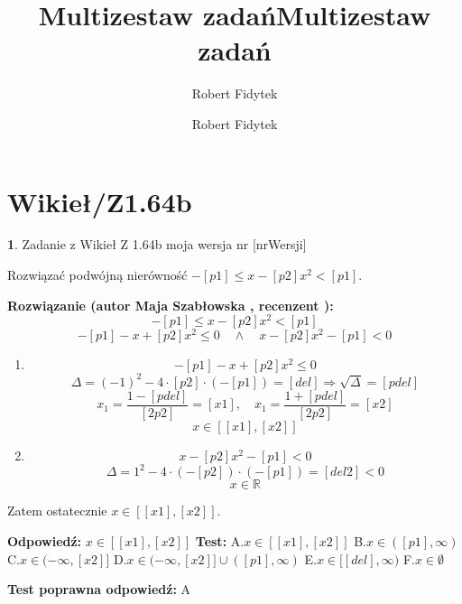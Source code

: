 \documentclass[12pt, a4paper]{article}
\title{Multizestaw zadań}
\author{Robert Fidytek}
\date{}\documentclass[12pt, a4paper]{article}
\title{Multizestaw zadań}
\author{Robert Fidytek}
\date{}
\theoremstyle{definition} %
\newtheorem{zad}{}
\theoremstyle{definition} %
\newtheorem{zad}{}
\newcommand{\kategoria}[1]{\section{#1}} %
\newcommand{\zadStart}[1]{\begin{zad}#1\newline} %
\newcommand{\zadStop}{\end{zad}}   %
\newcommand{\rozwStart}[2]{\noindent \textbf{Rozwiązanie (autor #1 , recenzent #2): }\newline} %
\newcommand{\rozwStop}{\newline}                                            %
\newcommand{\odpStart}{\noindent \textbf{Odpowiedź:}\newline}    %
\newcommand{\odpStop}{\newline}                                             %
\newcommand{\testStart}{\noindent \textbf{Test:}\newline} %
\newcommand{\testStop}{\newline} %
\newcommand{\kluczStart}{\noindent \textbf{Test poprawna odpowiedź:}\newline} %
\newcommand{\kluczStop}{\newline} %
\begin{document}
\maketitle


\kategoria{Wikieł/Z1.64b}
\zadStart{Zadanie z Wikieł Z 1.64b moja wersja nr [nrWersji]}

Rozwiązać podwójną nierówność $-[p1]\leq x-[p2]x^{2} < [p1].$
\zadStop

\rozwStart{Maja Szabłowska}{}
$$-[p1]\leq x-[p2]x^{2} < [p1]$$
$$-[p1]-x+[p2]x^{2} \leq 0 \quad \land \quad x-[p2]x^{2}-[p1]<0$$
\begin{enumerate}
    \item $$-[p1]-x+[p2]x^{2} \leq 0$$
    $$\Delta=(-1)^{2}-4\cdot[p2]\cdot(-[p1])=[del] \Rightarrow \sqrt{\Delta}=[pdel]$$
    $$x_{1}=\frac{1-[pdel]}{[2p2]}=[x1], \quad x_{1}=\frac{1+[pdel]}{[2p2]}=[x2]$$
    $$x\in[[x1],[x2]]$$
    
    \item $$x-[p2]x^{2}-[p1]<0$$
    $$\Delta=1^{2}-4\cdot(-[p2])\cdot(-[p1])=[del2] < 0$$
    $$x\in\mathbb{R}$$
\end{enumerate}
Zatem ostatecznie $x\in[[x1],[x2]].$
\rozwStop


\odpStart
$x\in[[x1],[x2]]$
\odpStop
\testStart
A.$x\in[[x1],[x2]]$
B.$x\in([p1],\infty)$
C.$x\in(-\infty,[x2]]$
D.$x\in(-\infty,[x2]]\cup ([p1],\infty)$
E.$x\in[[del], \infty)$
F.$x\in\emptyset$


\testStop
\kluczStart
A
\kluczStop
\end{document}
